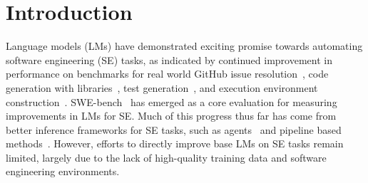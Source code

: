\section{Introduction}
\label{sec:intro}


Language models (LMs) have demonstrated exciting promise towards automating software engineering (SE) tasks, as indicated by continued improvement in performance on benchmarks for real world GitHub issue resolution~\citep{jimenez_swe-bench_2024,yang_swe-bench_2024}, code generation with libraries~\citep{zhao_commit0_2024,zhuo2024bigcodebenchbenchmarkingcodegeneration}, test generation~\citep{mündler2025swtbenchtestingvalidatingrealworld}, and execution environment construction~\citep{bogin2024superevaluatingagentssetting,eliseeva2025envbenchbenchmarkautomatedenvironment,vergopoulos2025automatedbenchmarkgenerationrepositorylevel}.
SWE-bench~\citep{jimenez_swe-bench_2024} has emerged as a core evaluation for measuring improvements in LMs for SE.
Much of this progress thus far has come from better inference frameworks for SE tasks, such as agents~\citep{yang_swe-agent_2024,wang_openhands_2024,antoniades_swe-search_2024,su2025learnbyinteractdatacentricframeworkselfadaptive} and pipeline based methods~\citep{xia_agentless_2024,orwall2024moatless,zhang_autocoderover_2024}.
However, efforts to directly improve base LMs on SE tasks remain limited, largely due to the lack of high-quality training data and software engineering environments.

